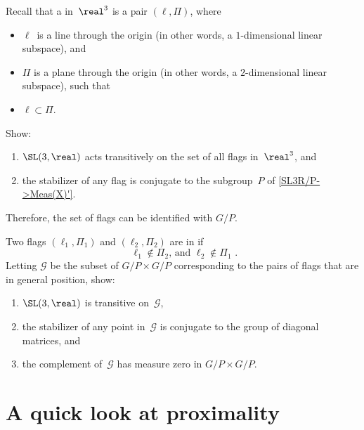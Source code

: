 \begin{exercises}
\item \label{GTransOnFlags}
Recall that a  in~$\real^3$ is a pair $(\ell, \Pi)$, where 
	\begin{itemize}
	\item $\ell$\, is a line through the origin (in other words, a $1$-dimensional linear subspace),
	and
	\item $\Pi$ is a plane through the origin (in other words, a $2$-dimensional linear subspace),
	such that
	\item $\ell \subset \Pi$.
	\end{itemize}
Show:
	\begin{enumerate}
	\item $\SL(3,\real)$ acts transitively on the set of all flags in~$\real^3$,
	and
	\item the stabilizer of any flag is conjugate to the subgroup~$P$ of
 \cref{SL3R/P->Meas(X)'}.
 	\end{enumerate}
Therefore, the set of flags can be identified with $G/P$.

\item \label{GTransOnP/PxG/P}
Two flags $(\ell_1,\Pi_1)$ and $(\ell_2,\Pi_2)$ are in  if 
	$$ \text{
	$\ell_1 \notin \Pi_2$, \  
	and \ 
	$\ell_2 \notin \Pi_1$
	} .$$
Letting $\mathcal{G}$ be the subset of $G/P \times G/P$ corresponding to the pairs of flags that are in general position, show:
	\begin{enumerate}
	\item \label{GTransOnP/PxG/P-trans}
	$\SL(3,\real)$ is transitive on~$\mathcal{G}$,
	\item \label{GTransOnP/PxG/P-stab}
	the stabilizer of any point in~$\mathcal{G}$ is conjugate to the group of diagonal matrices,
	and
	\item the complement of~$\mathcal{G}$ has measure zero in $G/P \times G/P$.
	\end{enumerate}
\end{exercises}




\section{A quick look at proximality} \label{QuickProximalitySect}

